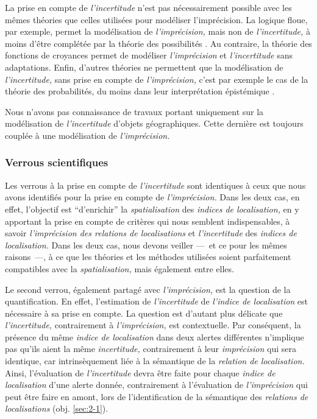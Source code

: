 La prise en compte de \emph{l'incertitude} n'est pas nécessairement
possible avec les mêmes théories que celles utilisées pour modéliser
l'imprécision. La logique floue, par exemple, permet la modélisation
de \emph{l'imprécision,} mais non de \emph{l'incertitude,} à moins
d'être complétée par la théorie des possibilités
\autocite{Bouchon-Meunier1995,Bouchon-Meunier2007}. Au contraire, la
théorie des fonctions de croyances permet de modéliser
\emph{l'imprécision} et \emph{l'incertitude} sans adaptations. Enfin,
d'autres théories ne permettent que la modélisation de
\emph{l'incertitude,} sans prise en compte de \emph{l'imprécision,}
c'est par exemple le cas de la théorie des probabilités, du moins dans
leur interprétation épistémique \autocite{Hajek2019}.

Nous n'avons pas connaissance de travaux portant uniquement sur la
modélisation de \emph{l'incertitude} d'objets géographiques. Cette
dernière est toujours couplée à une modélisation de
\emph{l'imprécision.}

\subsubsection{Verrous scientifiques}

Les verrous à la prise en compte de \emph{l'incertitude} sont
identiques à ceux que nous avons identifiés pour la prise en compte de
\emph{l'imprécision.} Dans les deux cas, en effet, l'objectif est
\enquote{d'enrichir} la \emph{spatialisation} des \emph{indices de
  localisation,} en y apportant la prise en compte de critères qui
nous semblent indispensables, à savoir \emph{l'imprécision des
  relations de localisations} et \emph{l'incertitude} des
\emph{indices de localisation.} Dans les deux cas, nous devons veiller
---~et ce pour les mêmes raisons~---, à ce que les théories et les
méthodes utilisées soient parfaitement compatibles avec la
\emph{spatialisation,} mais également entre elles.

Le second verrou, également partagé avec \emph{l'imprécision,} est la
question de la quantification. En effet, l'estimation de
\emph{l'incertitude} de \emph{l'indice de localisation} est nécessaire
à sa prise en compte. La question est d'autant plus délicate que
\emph{l'incertitude,} contrairement à \emph{l'imprécision,} est
contextuelle. Par conséquent, la présence du même \emph{indice de
  localisation} dans deux alertes différentes n'implique pas qu'ils
aient la même \emph{incertitude,} contrairement à leur
\emph{imprécision} qui sera identique, car intrinsèquement liée à la
sémantique de la \emph{relation de localisation.} Ainsi, l'évaluation
de \emph{l'incertitude} devra être faite pour chaque \emph{indice de
  localisation} d'une alerte donnée, contrairement à l'évaluation de
\emph{l'imprécision} qui peut être faire en amont, lors de
l’identification de la sémantique des \emph{relations de
  localisations} (obj. \ref{sec:2-1}).


